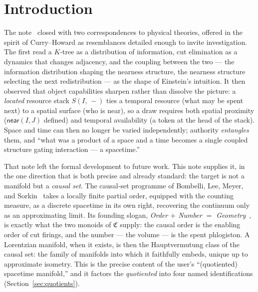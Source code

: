 \documentclass[11pt]{article}
\theoremstyle{definition}
\theoremstyle{plain}
\newcommand{\Cost}{\mathfrak{C}}
\newcommand{\near}{\mathsf{near}}
\newcommand{\lstk}[2]{S(#1,\, #2)}     %
\theoremstyle{remark}
\begin{document}
\tableofcontents
\bigskip

\section{Introduction}
\label{sec:intro}

The note~\cite{CostNote} closed with two correspondences to physical
theories, offered in the spirit of Curry--Howard as resemblances
detailed enough to invite investigation. The first read a $K$-tree as a
distribution of information, cut elimination as a dynamics that changes
adjacency, and the coupling between the two --- the information
distribution shaping the nearness structure, the nearness structure
selecting the next redistribution --- as the shape of Einstein's
intuition. It then observed that object capabilities sharpen rather than
dissolve the picture: a \emph{located} resource stack $\lstk{I}{-}$ ties
a temporal resource (what may be spent next) to a spatial surface (who is
near), so a draw requires both spatial proximity ($\near(I,J)$ defined)
and temporal availability (a token at the head of the stack). Space and
time can then no longer be varied independently; authority
\emph{entangles} them, and ``what was a product of a space and a time
becomes a single coupled structure gating interaction --- a spacetime.''

That note left the formal development to future work. This note supplies
it, in the one direction that is both precise and already standard: the
target is not a manifold but a \emph{causal set}. The causal-set
programme of Bombelli, Lee, Meyer, and Sorkin~\cite{BLMS} takes a locally
finite partial order, equipped with the counting measure, as a discrete
spacetime in its own right, recovering the continuum only as an
approximating limit. Its founding slogan, \emph{Order $+$ Number $=$
Geometry}~\cite{SorkinValdivia}, is exactly what the two monoids of
$\Cost$ supply: the causal order is the enabling order of cut firings,
and the number --- the volume --- is the spent phlogiston. A Lorentzian
manifold, when it exists, is then the Hauptvermutung class of the causal
set: the family of manifolds into which it faithfully embeds, unique up
to approximate isometry. This is the precise content of the user's
``(quotiented) spacetime manifold,'' and it factors the
\emph{quotiented} into four named identifications
(Section~\ref{sec:quotients}).
\end{document}
